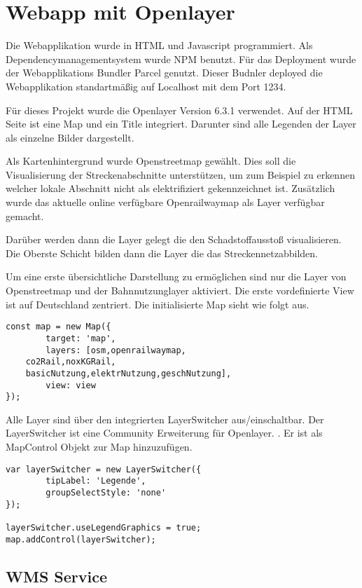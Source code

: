 \section{Webapp mit Openlayer}

Die Webapplikation wurde in HTML und Javascript programmiert. 
Als Dependencymanagementsystem wurde NPM benutzt.
Für das Deployment wurde der Webapplikations Bundler Parcel genutzt. Dieser Budnler deployed die Webapplikation standartmäßig auf Localhost mit dem Port 1234.


Für dieses Projekt wurde die Openlayer Version 6.3.1 verwendet.
Auf der HTML Seite ist eine Map und ein Title integriert.
Darunter sind alle Legenden der Layer als einzelne Bilder dargestellt.


Als Kartenhintergrund wurde Openstreetmap gewählt. Dies soll die Visualisierung der Streckenabschnitte unterstützen, um zum Beispiel zu erkennen welcher lokale Abschnitt nicht als elektrifiziert gekennzeichnet ist.
Zusätzlich wurde das aktuelle online verfügbare Openrailwaymap als Layer verfügbar gemacht.

Darüber werden dann die Layer gelegt die den Schadstoffausstoß visualisieren.
Die Oberste Schicht bilden dann die Layer die das Streckennetzabbilden.

Um eine erste übersichtliche Darstellung zu ermöglichen sind nur die Layer von Openstreetmap und der Bahnnutzunglayer aktiviert.
Die erste vordefinierte View ist auf Deutschland zentriert.
Die initialisierte Map sieht wie folgt aus.

\begin{lstlisting}[frame=single,basicstyle=\small]
const map = new Map({
        target: 'map',
        layers: [osm,openrailwaymap,
	co2Rail,noxKGRail,
	basicNutzung,elektrNutzung,geschNutzung],
        view: view
});
\end{lstlisting}


Alle Layer sind über den integrierten LayerSwitcher aus/einschaltbar.
Der LayerSwitcher ist eine Community Erweiterung für Openlayer. \cite{layerswitcher}. Er ist als MapControl Objekt zur Map hinzuzufügen.
\begin{lstlisting}[frame=single,basicstyle=\small]
var layerSwitcher = new LayerSwitcher({
        tipLabel: 'Legende',
        groupSelectStyle: 'none' 
});

layerSwitcher.useLegendGraphics = true;
map.addControl(layerSwitcher);
\end{lstlisting}


\subsection{WMS Service}

